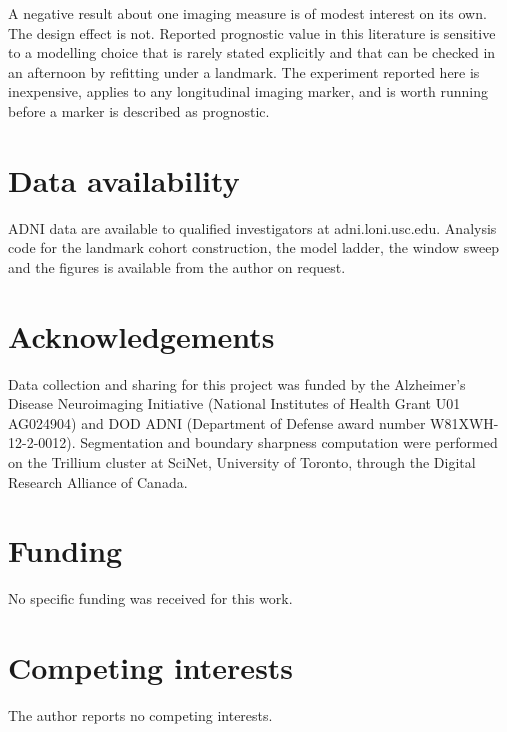 \documentclass[blue]{ludusofficial}
\begin{document}
A negative result about one imaging measure is of modest interest on its own. The design effect is not. Reported prognostic value in this literature is sensitive to a modelling choice that is rarely stated explicitly and that can be checked in an afternoon by refitting under a landmark. The experiment reported here is inexpensive, applies to any longitudinal imaging marker, and is worth running before a marker is described as prognostic.

\section*{Data availability}

ADNI data are available to qualified investigators at adni.loni.usc.edu. Analysis code for the landmark cohort construction, the model ladder, the window sweep and the figures is available from the author on request.

\section*{Acknowledgements}

Data collection and sharing for this project was funded by the Alzheimer's Disease Neuroimaging Initiative (National Institutes of Health Grant U01 AG024904) and DOD ADNI (Department of Defense award number W81XWH-12-2-0012). Segmentation and boundary sharpness computation were performed on the Trillium cluster at SciNet, University of Toronto, through the Digital Research Alliance of Canada.

\section*{Funding}

No specific funding was received for this work.

\section*{Competing interests}

The author reports no competing interests.




\clearpage
\end{document}

